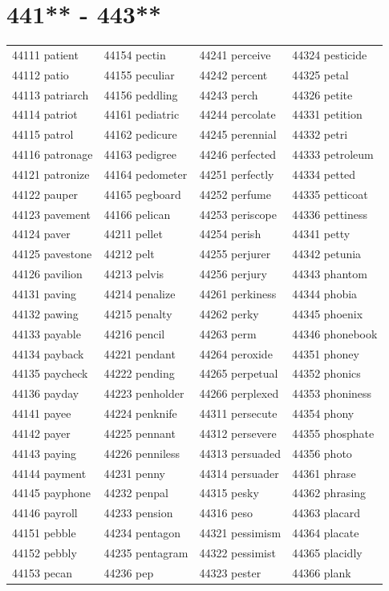 \documentclass[10pt, oneside]{book}
\begin{document}
\begin{table}
	\centering
	\section*{441** - 443**}
	\begin{tabular}{l l l l}
44111 patient &44154 pectin &44241 perceive &44324 pesticide\\
44112 patio &44155 peculiar &44242 percent &44325 petal\\
44113 patriarch &44156 peddling &44243 perch &44326 petite\\
44114 patriot &44161 pediatric &44244 percolate &44331 petition\\
44115 patrol &44162 pedicure &44245 perennial &44332 petri\\
44116 patronage &44163 pedigree &44246 perfected &44333 petroleum\\
44121 patronize &44164 pedometer &44251 perfectly &44334 petted\\
44122 pauper &44165 pegboard &44252 perfume &44335 petticoat\\
44123 pavement &44166 pelican &44253 periscope &44336 pettiness\\
44124 paver &44211 pellet &44254 perish &44341 petty\\
44125 pavestone &44212 pelt &44255 perjurer &44342 petunia\\
44126 pavilion &44213 pelvis &44256 perjury &44343 phantom\\
44131 paving &44214 penalize &44261 perkiness &44344 phobia\\
44132 pawing &44215 penalty &44262 perky &44345 phoenix\\
44133 payable &44216 pencil &44263 perm &44346 phonebook\\
44134 payback &44221 pendant &44264 peroxide &44351 phoney\\
44135 paycheck &44222 pending &44265 perpetual &44352 phonics\\
44136 payday &44223 penholder &44266 perplexed &44353 phoniness\\
44141 payee &44224 penknife &44311 persecute &44354 phony\\
44142 payer &44225 pennant &44312 persevere &44355 phosphate\\
44143 paying &44226 penniless &44313 persuaded &44356 photo\\
44144 payment &44231 penny &44314 persuader &44361 phrase\\
44145 payphone &44232 penpal &44315 pesky &44362 phrasing\\
44146 payroll &44233 pension &44316 peso &44363 placard\\
44151 pebble &44234 pentagon &44321 pessimism &44364 placate\\
44152 pebbly &44235 pentagram &44322 pessimist &44365 placidly\\
44153 pecan &44236 pep &44323 pester &44366 plank\\
	\end{tabular}
 \end{table}
\clearpage
\end{document}
